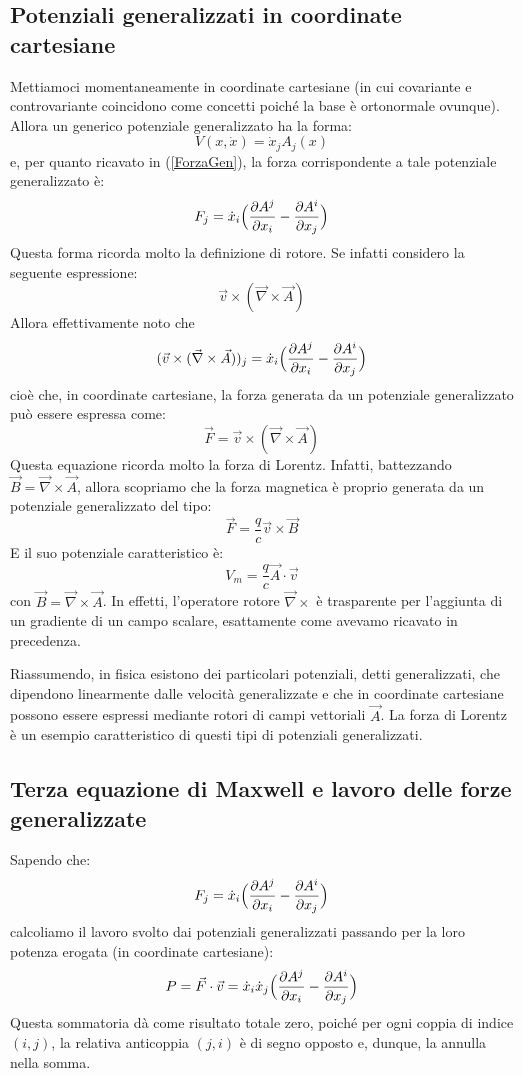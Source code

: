 \documentclass[a4paper,openany]{article}
\begin{document}
	\subsection{Potenziali generalizzati in coordinate cartesiane}
	Mettiamoci momentaneamente in coordinate cartesiane (in cui covariante e controvariante coincidono come concetti poiché la base è ortonormale ovunque). Allora un generico potenziale generalizzato ha la forma:
	$$
	V(x,\dot{x}) = \dot{x}_j A_j(x)
	$$
	e, per quanto ricavato in (\ref{ForzaGen}), la forza corrispondente a tale potenziale generalizzato è:
	$$
	F_j = \dot{x}_i \Bigl(\dfrac{\partial A^j}{\partial x_i} -\dfrac{\partial A^i}{\partial x_j}\Bigl)
	$$
	Questa forma ricorda molto la definizione di rotore. Se infatti considero la seguente espressione:
	$$
	\vec{v} \times (\vec{\nabla}\times \vec{A})
	$$
	Allora effettivamente noto che
	$$
	(\vec{v} \times (\vec{\nabla}\times \vec{A}))_j = \dot{x}_i \Bigl(\dfrac{\partial A^j}{\partial x_i} -\dfrac{\partial A^i}{\partial x_j}\Bigl) 
	$$
	cioè che, in coordinate cartesiane, la forza generata da un potenziale generalizzato può essere espressa come:
	\begin{equation}
		\vec{F} = \vec{v} \times (\vec{\nabla}\times \vec{A})
	\end{equation}
	Questa equazione ricorda molto la forza di Lorentz. Infatti, battezzando $\vec{B} = \vec{\nabla}\times \vec{A}$, allora scopriamo che la forza magnetica è proprio generata da un potenziale generalizzato del tipo:
	\begin{equation}
		\vec{F} = \dfrac{q}{c}\vec{v}\times\vec{B}
	\end{equation}
	E il suo potenziale caratteristico è:
	\begin{equation}
		V_m = \dfrac{q}{c}\vec{A}\cdot\vec{v}
	\end{equation}
	con $\vec{B} = \vec{\nabla}\times\vec{A}$. In effetti, l'operatore rotore $\vec{\nabla}\times$ è trasparente per l'aggiunta di un gradiente di un campo scalare, esattamente come avevamo ricavato in precedenza.
	
	Riassumendo, in fisica esistono dei particolari potenziali, detti generalizzati, che dipendono linearmente dalle velocità generalizzate e che in coordinate cartesiane possono essere espressi mediante rotori di campi vettoriali $\vec{A}$. La forza di Lorentz è un esempio caratteristico di questi tipi di potenziali generalizzati.
	\subsection{Terza equazione di Maxwell e lavoro delle forze generalizzate}
	Sapendo che:
	$$
	F_j = \dot{x}_i \Bigl(\dfrac{\partial A^j}{\partial x_i} -\dfrac{\partial A^i}{\partial x_j}\Bigl)
	$$
	calcoliamo il lavoro svolto dai potenziali generalizzati passando per la loro potenza erogata (in coordinate cartesiane):
	$$
	P = \vec{F}\cdot\vec{v} = \dot{x}_i\dot{x}_j \Bigl(\dfrac{\partial A^j}{\partial x_i} -\dfrac{\partial A^i}{\partial x_j}\Bigl)
	$$
	Questa sommatoria dà come risultato totale zero, poiché per ogni coppia di indice $(i,j)$, la relativa anticoppia $(j,i)$ è di segno opposto e, dunque, la annulla nella somma. 
	
\end{document}
